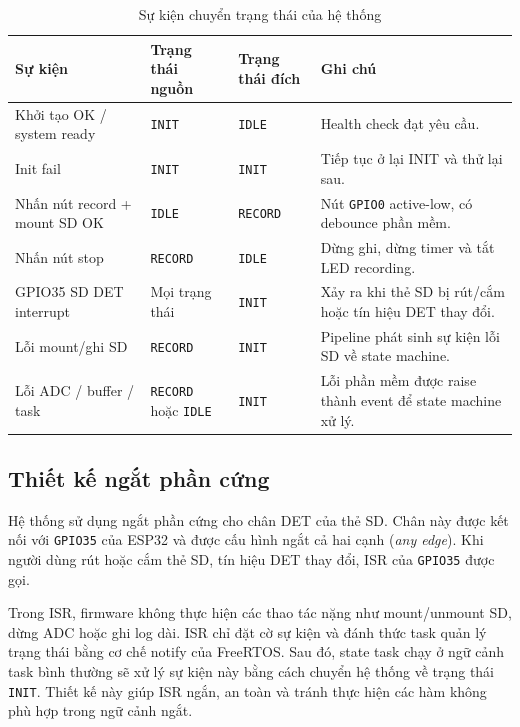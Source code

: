 \begin{table}[H]
    \centering
    \caption{Sự kiện chuyển trạng thái của hệ thống}
    \label{tab:state_transitions}
    \begin{tabular}{|p{4cm}|p{3cm}|p{3cm}|p{4cm}|}
        \hline
        \textbf{Sự kiện} & \textbf{Trạng thái nguồn} & \textbf{Trạng thái đích} & \textbf{Ghi chú} \\
        \hline
        Khởi tạo OK / system ready & \texttt{INIT} & \texttt{IDLE} &
        Health check đạt yêu cầu. \\
        \hline
        Init fail & \texttt{INIT} & \texttt{INIT} &
        Tiếp tục ở lại INIT và thử lại sau. \\
        \hline
        Nhấn nút record + mount SD OK & \texttt{IDLE} & \texttt{RECORD} &
        Nút \texttt{GPIO0} active-low, có debounce phần mềm. \\
        \hline
        Nhấn nút stop & \texttt{RECORD} & \texttt{IDLE} &
        Dừng ghi, dừng timer và tắt LED recording. \\
        \hline
        GPIO35 SD DET interrupt & Mọi trạng thái & \texttt{INIT} &
        Xảy ra khi thẻ SD bị rút/cắm hoặc tín hiệu DET thay đổi. \\
        \hline
        Lỗi mount/ghi SD & \texttt{RECORD} & \texttt{INIT} &
        Pipeline phát sinh sự kiện lỗi SD về state machine. \\
        \hline
        Lỗi ADC / buffer / task & \texttt{RECORD} hoặc \texttt{IDLE} & \texttt{INIT} &
        Lỗi phần mềm được raise thành event để state machine xử lý. \\
        \hline
    \end{tabular}
\end{table}

\subsection{Thiết kế ngắt phần cứng}

Hệ thống sử dụng ngắt phần cứng cho chân DET của thẻ SD. Chân này được kết nối
với \texttt{GPIO35} của ESP32 và được cấu hình ngắt cả hai cạnh
(\textit{any edge}). Khi người dùng rút hoặc cắm thẻ SD, tín hiệu DET thay đổi,
ISR của \texttt{GPIO35} được gọi.

Trong ISR, firmware không thực hiện các thao tác nặng như mount/unmount SD,
dừng ADC hoặc ghi log dài. ISR chỉ đặt cờ sự kiện và đánh thức task quản lý
trạng thái bằng cơ chế notify của FreeRTOS. Sau đó, state task chạy ở ngữ cảnh
task bình thường sẽ xử lý sự kiện này bằng cách chuyển hệ thống về trạng thái
\texttt{INIT}. Thiết kế này giúp ISR ngắn, an toàn và tránh thực hiện các hàm
không phù hợp trong ngữ cảnh ngắt.

